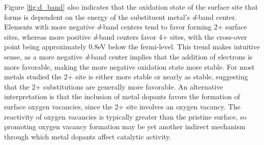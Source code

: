 Figure \ref{fig:d_band} also indicates that the oxidation state of the surface site that forms is dependent on the energy of the substituent metal's \textit{d}-band center. Elements with more negative \textit{d}-band centers tend to favor forming 2+ surface sites, whereas more positive \textit{d}-band centers favor 4+ sites, with the cross-over point being approximately 0.8eV below the fermi-level. This trend makes intuitive sense, as a more negative \textit{d}-band center implies that the addition of electrons is more favorable, making the more negative oxidation state more stable. For most metals studied the 2+ site is either more stable or nearly as stable, suggesting that the 2+ substitutions are generally more favorable. An alternative interpretation is that the inclusion of metal dopants favors the formation of surface oxygen vacancies, since the 2+ site involves an oxygen vacancy. The reactivity of oxygen vacancies is typically greater than the pristine surface, so promoting oxygen vacancy formation may be yet another indirect mechanism through which metal dopants affect catalytic activity.




